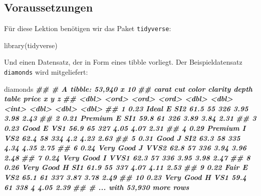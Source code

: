\documentclass[
  ngerman,
]{article}
\newenvironment{Shaded}{\begin{snugshade}}{\end{snugshade}}
\newcommand{\DocumentationTok}[1]{\textcolor[rgb]{0.56,0.35,0.01}{\textbf{\textit{#1}}}}
\newcommand{\FunctionTok}[1]{\textcolor[rgb]{0.00,0.00,0.00}{#1}}
\newcommand{\NormalTok}[1]{#1}
\begin{document}
\hypertarget{voraussetzungen}{%
\subsection{Voraussetzungen}\label{voraussetzungen}}

Für diese Lektion benötigen wir das Paket \texttt{tidyverse}:

\begin{Shaded}
\begin{Highlighting}[]
\FunctionTok{library}\NormalTok{(tidyverse)}
\end{Highlighting}
\end{Shaded}

Und einen Datensatz, der in Form eines tibble vorliegt. Der Beispieldatensatz \texttt{diamonds} wird mitgeliefert:

\begin{Shaded}
\begin{Highlighting}[]
\NormalTok{diamonds}
\DocumentationTok{\#\# \# A tibble: 53,940 x 10}
\DocumentationTok{\#\#    carat cut       color clarity depth table price     x     y     z}
\DocumentationTok{\#\#    \textless{}dbl\textgreater{} \textless{}ord\textgreater{}     \textless{}ord\textgreater{} \textless{}ord\textgreater{}   \textless{}dbl\textgreater{} \textless{}dbl\textgreater{} \textless{}int\textgreater{} \textless{}dbl\textgreater{} \textless{}dbl\textgreater{} \textless{}dbl\textgreater{}}
\DocumentationTok{\#\#  1  0.23 Ideal     E     SI2      61.5    55   326  3.95  3.98  2.43}
\DocumentationTok{\#\#  2  0.21 Premium   E     SI1      59.8    61   326  3.89  3.84  2.31}
\DocumentationTok{\#\#  3  0.23 Good      E     VS1      56.9    65   327  4.05  4.07  2.31}
\DocumentationTok{\#\#  4  0.29 Premium   I     VS2      62.4    58   334  4.2   4.23  2.63}
\DocumentationTok{\#\#  5  0.31 Good      J     SI2      63.3    58   335  4.34  4.35  2.75}
\DocumentationTok{\#\#  6  0.24 Very Good J     VVS2     62.8    57   336  3.94  3.96  2.48}
\DocumentationTok{\#\#  7  0.24 Very Good I     VVS1     62.3    57   336  3.95  3.98  2.47}
\DocumentationTok{\#\#  8  0.26 Very Good H     SI1      61.9    55   337  4.07  4.11  2.53}
\DocumentationTok{\#\#  9  0.22 Fair      E     VS2      65.1    61   337  3.87  3.78  2.49}
\DocumentationTok{\#\# 10  0.23 Very Good H     VS1      59.4    61   338  4     4.05  2.39}
\DocumentationTok{\#\# \# ... with 53,930 more rows}
\end{Highlighting}
\end{Shaded}
\end{document}
